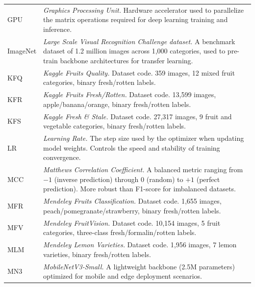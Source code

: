 \documentclass[12pt, a4paper]{article}
\begin{document}
\begin{table}[h]
\begin{tabular}{L{2.5cm} L{11cm}}
GPU     & \textit{Graphics Processing Unit.}
          Hardware accelerator used to parallelize the matrix operations
          required for deep learning training and inference. \\[4pt]

ImageNet & \textit{Large Scale Visual Recognition Challenge dataset.}
           A benchmark dataset of 1.2 million images across 1,000 categories,
           used to pre-train backbone architectures for transfer learning. \\[4pt]

KFQ     & \textit{Kaggle Fruits Quality.} Dataset code. 359 images, 12 mixed
          fruit categories, binary fresh/rotten labels. \\[4pt]

KFR     & \textit{Kaggle Fruits Fresh/Rotten.} Dataset code. 13,599 images,
          apple/banana/orange, binary fresh/rotten labels. \\[4pt]

KFS     & \textit{Kaggle Fresh \& Stale.} Dataset code. 27,317 images,
          9 fruit and vegetable categories, binary fresh/rotten labels. \\[4pt]

LR      & \textit{Learning Rate.}
          The step size used by the optimizer when updating model weights.
          Controls the speed and stability of training convergence. \\[4pt]

MCC     & \textit{Matthews Correlation Coefficient.}
          A balanced metric ranging from $-1$ (inverse prediction)
          through $0$ (random) to $+1$ (perfect prediction).
          More robust than F1-score for imbalanced datasets. \\[4pt]

MFR     & \textit{Mendeley Fruits Classification.} Dataset code. 1,655 images,
          peach/pomegranate/strawberry, binary fresh/rotten labels. \\[4pt]

MFV     & \textit{Mendeley FruitVision.} Dataset code. 10,154 images,
          5 fruit categories, three-class fresh/formalin/rotten labels. \\[4pt]

MLM     & \textit{Mendeley Lemon Varieties.} Dataset code. 1,956 images,
          7 lemon varieties, binary fresh/rotten labels. \\[4pt]

MN3     & \textit{MobileNetV3-Small.}
          A lightweight backbone (2.5M parameters) optimized for
          mobile and edge deployment scenarios. \\[4pt]


\end{tabular}
\end{table}
\end{document}
